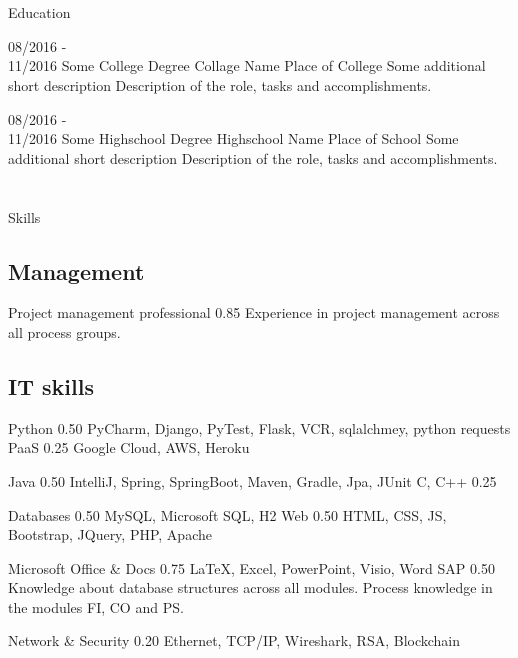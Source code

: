 \documentclass[12pt, letterpaper]{amin-cv}
\begin{document}
\section{\faBook}{Education}

\begin{entrylist}
	\entry
	{08/2016 -\\ 11/2016}
	{Some College Degree}
	{Collage Name}
	{Place of College}
	{Some additional short description}
	{Description of the role, tasks and accomplishments. \lipsum[2-2]}
	
	\entry
	{08/2016 -\\ 11/2016}
	{Some Highschool Degree}
	{Highschool Name}
	{Place of School}
	{Some additional short description}
	{Description of the role, tasks and accomplishments. \lipsum[2-2]}
	
	
	
\end{entrylist}



\section{\faTasks}{Skills}

\subsection{Management}
\begin{entrylist}
	
	\entrySmall
	{Project management professional}
	{0.85}
	{Experience in project management across all process groups.}
	
\end{entrylist}

\newpage

\subsection{IT skills}
\begin{entrylist}
	
	\entrySmallDouble
	{Python}
	{0.50}
	{PyCharm, Django, PyTest, Flask, VCR, sqlalchmey, python requests}
	{PaaS}
	{0.25}
	{Google Cloud, AWS, Heroku}
	
	\entrySmallDouble
	{Java}
	{0.50}
	{IntelliJ, Spring, SpringBoot, Maven, Gradle, Jpa, JUnit}
	{C, C++}
	{0.25}
	{}
	
	\entrySmallDouble
	{Databases}
	{0.50}
	{MySQL, Microsoft SQL, H2}
	{Web}
	{0.50}
	{HTML, CSS, JS, Bootstrap, JQuery, PHP, Apache}
	
	\entrySmallDouble
	{Microsoft Office \& Docs}
	{0.75}
	{\LaTeX, Excel, PowerPoint, Visio, Word}
	{SAP}
	{0.50}
	{Knowledge about database structures across all modules. Process knowledge in the modules FI, CO and PS.}
	
	\entrySmall
	{Network \& Security}
	{0.20}
	{Ethernet, TCP/IP, Wireshark, RSA, Blockchain}
	
\end{entrylist}
\end{document}
